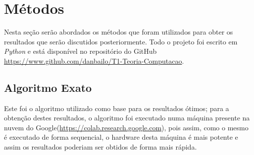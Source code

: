 \documentclass[a4paper, 12pt]{article}
\begin{document}
\clearpage

\section{Métodos}
Nesta seção serão abordados os métodos que foram utilizados para obter os resultados que serão discutidos posteriormente.
Todo o projeto foi escrito em \textit{Python} e está disponível no repositório do GitHub \url{https://www.github.com/danbailo/T1-Teoria-Computacao}.

\subsection{Algoritmo Exato}

Este foi o algoritmo utilizado como base para os resultados ótimos; para a obtenção destes resultados, o algoritmo
foi executado numa máquina presente na nuvem do Google(\url{https://colab.research.google.com}), pois assim,
como o mesmo é executado de forma sequencial, o hardware desta máquina é mais potente e assim os resultados poderiam ser obtidos de forma mais rápida.
\end{document}
